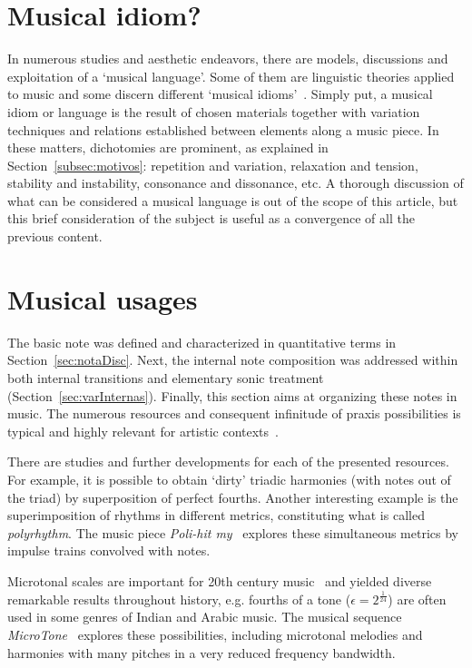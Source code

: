 \documentclass[format=acmsmall, review=false, screen=true]{acmart}
\begin{document}
\section{Musical idiom?}
In numerous studies and aesthetic endeavors, there are models, discussions and exploitation of a `musical language'.
Some of them are linguistic theories applied to music
and some discern different `musical
idioms'~\cite{Lerdahl, Harmonia, Salzer,Alfaix}. Simply put, a musical idiom or language
is the result of chosen materials together with variation techniques and
relations established between elements along a music piece. In these matters,
dichotomies are prominent, as explained in Section~\ref{subsec:motivos}:
repetition and variation, relaxation and tension, stability and instability, consonance and dissonance, etc.
A thorough discussion of what can be considered a musical language is out of the scope of this article, but this brief consideration of the subject is useful as a convergence of all the previous content.

\section{Musical usages}\label{subsec:usosmusicais3}
The basic note was defined and characterized in quantitative terms in Section~\ref{sec:notaDisc}.
Next, the internal note
composition was addressed within both internal transitions and elementary sonic treatment
(Section~\ref{sec:varInternas}). Finally, this section aims at organizing these notes in music. The numerous resources and consequent infinitude
of praxis possibilities is typical and highly relevant for artistic contexts~\cite{Harmonia,Webern}.

There are studies and further developments for each of the presented resources.
For example, it is possible to obtain `dirty' triadic harmonies (with notes out of the triad) by superposition of perfect fourths.
Another interesting example is the superimposition of rhythms in different metrics, constituting what is
called \emph{polyrhythm}. The music piece \emph{Poli-hit my}~\cite{MASSA} explores these simultaneous metrics by impulse trains convolved with notes.

Microtonal scales are important for 20th
century music~\cite{microtonalidade} and yielded diverse remarkable results throughout history, e.g.
fourths of a tone ($\epsilon=2^{\frac{1}{24}}$) are often used in some genres of Indian and Arabic music.
The musical sequence \emph{MicroTone}~\cite{MASSA} explores these possibilities,
including microtonal melodies and harmonies
with many pitches in a very reduced frequency bandwidth.
\end{document}

